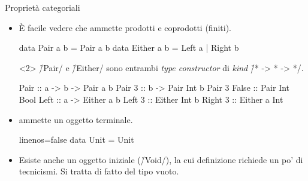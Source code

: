 \begin{frame}[fragile]{\secname}{Proprietà categoriali}
\begin{overlayarea}{\textwidth}{0.7\textheight}
\begin{itemize}
\item È facile vedere che \Hask{} ammette prodotti e coprodotti (finiti).

\begin{haskellcode}
data Pair a b = Pair a b
data Either a b = Left a | Right b
\end{haskellcode}

\begin{onlyenv}<2>
\h/Pair/ e \h/Either/ sono entrambi \emph{type constructor} di \emph{kind} \h/* -> * -> */.

\begin{haskellcode}
Pair :: a -> b -> Pair a b
Pair 3 :: b -> Pair Int b
Pair 3 False :: Pair Int Bool
Left :: a -> Either a b
Left 3 :: Either Int b
Right 3 :: Either a Int
\end{haskellcode}
\end{onlyenv}

\item<3-> \Hask{} ammette un oggetto terminale.

\begin{haskellcode*}{linenos=false}
data Unit = Unit
\end{haskellcode*}

\item<4-> Esiste anche un oggetto iniziale (\h/Void/), la cui definizione richiede un po' di tecnicismi. Si tratta di fatto del tipo vuoto.
\end{itemize}
\end{overlayarea}
\end{frame}

